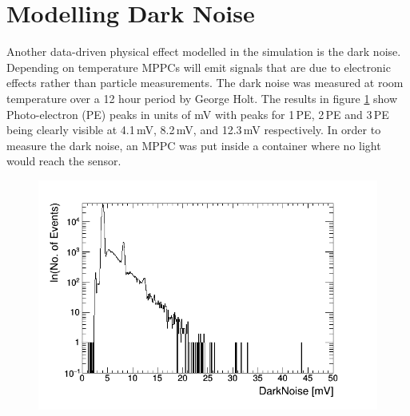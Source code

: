 \section{Modelling Dark Noise}\label{sec:GEANT4Simulation_ModellingDarkNoise}
Another data-driven physical effect modelled in the simulation is the dark noise. Depending on temperature MPPCs will emit signals that are due to electronic effects rather than particle measurements. The dark noise was measured at room temperature over a 12 hour period by George Holt. The results in figure \ref{fig:pureDarkNoise} show Photo-electron (PE) peaks in units of mV with peaks for 1\,PE, 2\,PE and 3\,PE being clearly visible at 4.1\,mV, 8.2\,mV, and 12.3\,mV respectively. In order to measure the dark noise, an MPPC was put inside a container where no light would reach the sensor. 
\begin{figure}[!h]
 \centering
 \includegraphics[width=0.8\linewidth]{pureDarkNoise_output.png}
 \label{fig:pureDarkNoise}
\end{figure}

